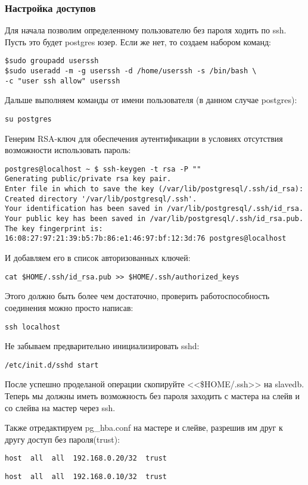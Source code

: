 \subsubsection{Настройка доступов}
Для начала позволим определенному пользователю без пароля ходить по ssh. Пусть это будет postgres юзер. 
Если же нет, то создаем набором команд:
\begin{lstlisting}[label=lst:streaming1,caption=Создаем пользователя userssh]
$sudo groupadd userssh
$sudo useradd -m -g userssh -d /home/userssh -s /bin/bash \
-c "user ssh allow" userssh
\end{lstlisting}

Дальше выполняем команды от имени пользователя (в данном случае postgres):
\begin{lstlisting}[label=lst:streaming2,caption=Логинимся под пользователем postgres]
su postgres
\end{lstlisting}

Генерим RSA-ключ для обеспечения аутентификации в условиях отсутствия возможности использовать пароль:
\begin{lstlisting}[label=lst:streaming3,caption=Генерим RSA-ключ]
postgres@localhost ~ $ ssh-keygen -t rsa -P ""
Generating public/private rsa key pair.
Enter file in which to save the key (/var/lib/postgresql/.ssh/id_rsa): 
Created directory '/var/lib/postgresql/.ssh'.
Your identification has been saved in /var/lib/postgresql/.ssh/id_rsa.
Your public key has been saved in /var/lib/postgresql/.ssh/id_rsa.pub.
The key fingerprint is:
16:08:27:97:21:39:b5:7b:86:e1:46:97:bf:12:3d:76 postgres@localhost
\end{lstlisting}

И добавляем его в список авторизованных ключей:
\begin{lstlisting}[label=lst:streaming4,caption=Добавляем его в список авторизованных ключей]
cat $HOME/.ssh/id_rsa.pub >> $HOME/.ssh/authorized_keys
\end{lstlisting}

Этого должно быть более чем достаточно, проверить работоспособность соединения можно просто написав:
\begin{lstlisting}[label=lst:streaming5,caption=Пробуем зайти на ssh без пароля]
ssh localhost
\end{lstlisting}

Не забываем предварительно инициализировать sshd:
\begin{lstlisting}[label=lst:streaming6,caption=Запуск sshd]
/etc/init.d/sshd start
\end{lstlisting}

После успешно проделаной операции скопируйте <<\$HOME/.ssh>> на slavedb. 
Теперь мы должны иметь возможность без пароля заходить с мастера на слейв и со слейва на мастер через ssh.

Также отредактируем pg\_hba.conf на мастере и слейве, разрешив им друг к другу доступ без пароля(trust):
\begin{lstlisting}[label=lst:streaming7,caption=Мастер pg\_hba.conf]
host  all  all  192.168.0.20/32  trust
\end{lstlisting}
\begin{lstlisting}[label=lst:streaming8,caption=Слейв pg\_hba.conf]
host  all  all  192.168.0.10/32  trust
\end{lstlisting}